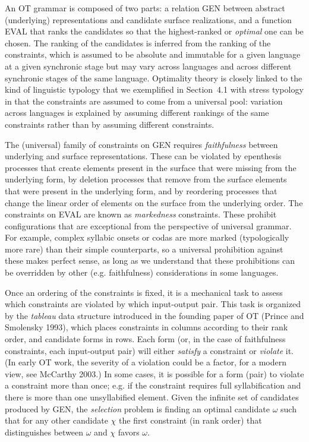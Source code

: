 An OT grammar is composed of two parts: a relation GEN between abstract
(underlying) representations and candidate surface realizations, and a
function EVAL that ranks the candidates so that the highest-ranked or {\it
  optimal} one can be chosen. The ranking of the candidates is inferred from
the ranking of the constraints, which is assumed to be absolute and immutable
for a given language at a given synchronic stage but may vary across languages
and across different synchronic stages of the same language. Optimality theory
is closely linked to the kind of linguistic typology that we exemplified in
Section~4.1 with stress typology in that the constraints are assumed to come
from a universal pool: variation across languages is explained by assuming
different rankings of the same constraints rather than by assuming different
constraints.

The (universal) family of constraints on GEN requires {\it faithfulness}
between underlying and surface representations. These can be violated by
epenthesis processes that create elements present in the surface that were
missing from the underlying form, by deletion processes that remove from the
surface elements that were present in the underlying form, and by reordering
processes that change the linear order of elements on the surface from the
underlying order. The constraints on EVAL are known as {\it markedness}
constraints. These prohibit configurations that are exceptional from the
perspective of universal grammar. For example, complex syllabic onsets or
codas are more marked (typologically more rare) than their simple
counterparts, so a universal prohibition against these makes perfect sense, as
long as we understand that these prohibitions can be overridden by other (e.g.
faithfulness) considerations in some languages.

Once an ordering of the constraints is fixed, it is a mechanical task to
assess which constraints are violated by which input-output pair. This task is
organized by the {\it tableau} data structure introduced in the founding paper
of OT \nocite{Prince:1993}(Prince and Smolensky 1993), which places
constraints in columns according to their rank order, and candidate forms in
rows. Each form (or, in the case of faithfulness constraints, each
input-output pair) will either {\it satisfy} a constraint or {\it violate}
it. (In early OT work, the severity of a violation could be a factor, for a
modern view, see McCarthy 2003.)\nocite{McCarthy:2003} In some cases, it
is possible for a form (pair) to violate a constraint more than once; e.g. if
the constraint requires full syllabification and there is more than one
unsyllabified element. Given the infinite set of candidates produced by GEN,
the {\it selection} problem is finding an optimal candidate $\omega$ such that
for any other candidate $\chi$ the first constraint (in rank order) that
distinguishes between $\omega$ and $\chi$ favors $\omega$.

